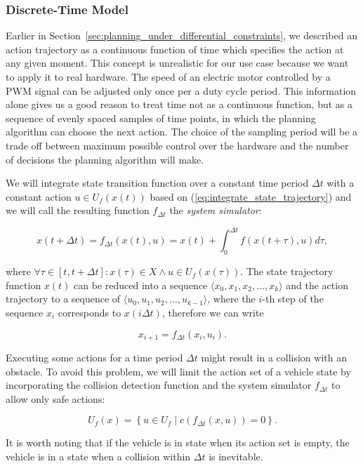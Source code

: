 \subsubsection{Discrete-Time Model}

Earlier in Section~\ref{sec:planning_under_differential_constraints}, we described an action trajectory as a continuous function of time which specifies the action at any given moment. This concept is unrealistic for our use case because we want to apply it to real hardware. The speed of an electric motor controlled by a \gls{PWM} signal can be adjusted only once per a duty cycle period. This information alone gives us a good reason to treat time not as a continuous function, but as a sequence of evenly spaced samples of time points, in which the planning algorithm can choose the next action. The choice of the sampling period will be a trade off between maximum possible control over the hardware and the number of decisions the planning algorithm will make.

We will integrate state transition function over a constant time period $\Delta t$ with a constant action $u\in U_f(x(t))$ based on (\ref{eq:integrate_state_trajectory}) and we will call the resulting function $f_{\Delta t}$ the \textit{system simulator}:

\begin{equation}
	x(t+\Delta t)=f_{\Delta t}(x(t), u)=x(t) + \int_{0}^{\Delta t} f\left(x(t+\tau), u \right) d\tau,
\end{equation}

where $\forall \tau \in [t, t+\Delta t]: x(\tau)\in X \wedge u\in U_f(x(\tau))$. The state trajectory function $x(t)$ can be reduced into a sequence $\langle x_0, x_1, x_2, \ldots, x_k\rangle$ and the action trajectory to a sequence of $\langle u_0, u_1, u_2, \ldots, u_{k-1}\rangle$, where the $i$-th step of the sequence $x_i$ corresponds to $x(i\Delta t)$, therefore we can write

\[
	x_{i+1}=f_{\Delta t}(x_i, u_i).
\]

Executing some actions for a time period $\Delta t$ might result in a collision with an obstacle. To avoid this problem, we will limit the action set of a vehicle state by incorporating the collision detection function and the system simulator $f_{\Delta t}$ to allow only safe actions:

\[
U_f(x)=\left\{u\in U_f \mid c(f_{\Delta t}(x, u)) = 0\right\}.
\]

It is worth noting that if the vehicle is in state when its action set is empty, the vehicle is in a state when a collision within $\Delta t$ is inevitable.

